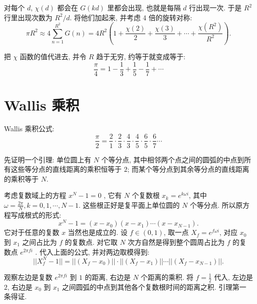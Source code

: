 对每个 $d$, $ \chi(d) $ 都会在 $ G(kd) $ 里都会出现, 也就是每隔 $d$ 行出现一次.
于是 $ R^2 $ 行里出现次数为 $ R^2/d $.
将他们加起来, 并考虑 4 倍的旋转对称:
\[ \pi R^2 \approx 4\sum_{n=1}^{R^2}{G(n)} = 4R^2\left( 1 + \frac{\chi(2)}{2} + \frac{\chi(3)}{3} + \cdots + \frac{\chi(R^2)}{R^2} \right) .\]

把 $ \chi $ 函数的值代进去, 并令 $ R $ 趋于无穷, 约等于就变成等于:
\[ \frac{\pi}{4} = 1 - \frac{1}{3} + \frac{1}{5} -\frac{1}{7} + \cdots \]

\newpage

\section{Wallis 乘积}

Wallis 乘积公式: \[ \frac{\pi}{2} = \frac{2}{1}\cdot\frac{2}{3}\cdot\frac{4}{3}\cdot\frac{4}{5}\cdot\frac{6}{5}\cdot\frac{6}{7}\cdots \]

先证明一个引理: 单位圆上有 $ N $ 个等分点, 其中相邻两个点之间的圆弧的中点到所有这些等分点的直线距离的乘积恒等于 $ 2 $; 而某个等分点到其余等分点的直线距离的乘积等于 $ N $.

考虑复数域上的方程 $x^N-1=0 $ , 它有 $ N $ 个复数根 $ x_k = e^{k\omega i}$, 其中 $ \omega = \frac{2\pi}{N}, k=0,1,\cdots,N-1 $. 这些根正好是复平面上单位圆的 $ N $ 个等分点. 所以原方程写成根式的形式: \[ x^N - 1 = (x - x_0)(x - x_1)\cdots(x-x_{N-1}) .\] 它对于任意的复数 $ x $ 当然也是成立的. 设 $ f \in (0,1) $, 取一点 $ X_f =  e^{f\omega i} $, 对应 $ x_0 $ 到 $ x_1 $ 之间占比为 $ f $ 的复数点. 对它取 $ N $ 次方自然是得到整个圆周占比为 $ f $ 的复数点 $e^{2\pi fi}$ . 代入上面的公式, 并对两边取模得到:
\[ || X_f^N-1 || = ||(X_f-x_0)||\cdot||(X_f - x_1)||\cdots||(X_f-x_{N-1})|| .\]

观察左边是复数 $e^{2\pi fi}$ 到 $ 1 $ 的距离, 右边是 $ N $ 个距离的乘积. 将 $\displaystyle f = \frac{1}{2} $ 代入, 左边是 $ 2 $, 右边是 $ x_0 $ 到 $ x_1 $ 之间圆弧的中点到其他各个复数根时间的距离之积. 引理第一条得证.

